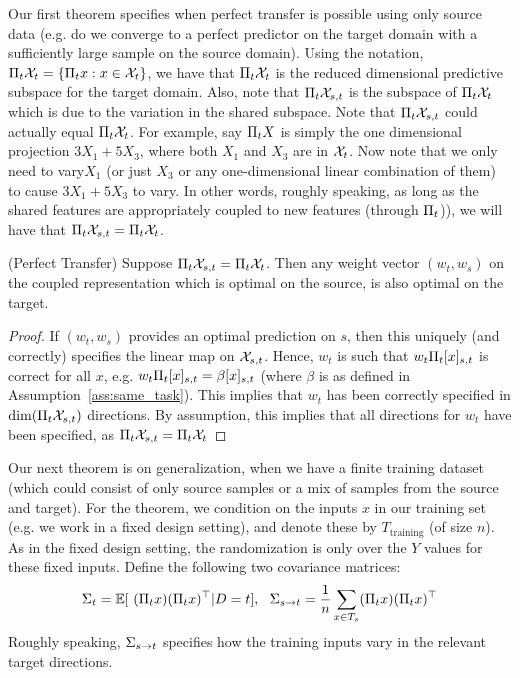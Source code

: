 \iffalse
First
note, that $w_t$ is a weight acting on $\Projt x$, and this projection
couples the features in $\xst$ with $\xtp$ --- so that with a nonzero weight
$w_t$, our predictions could vary with $\xtp$.
\fi

Our first theorem specifies when perfect transfer is possible using
only source data (e.g. do we converge to a perfect predictor on the
target domain with a sufficiently large sample on the source
domain). Using the notation, $\Pi_t \mathcal{X}_t=\{\Pi_t x: x\in\mathcal{X}_t\}$,
we have that $\Pi_t \mathcal{X}_t$ is the reduced
dimensional predictive subspace for the target domain. Also, note that
$\Pi_t \mathcal{X}_{s,t}$ is the subspace of $\Pi_t \mathcal{X}_t$ which is due
to the variation in the shared subspace. Note that $\Pi_t \mathcal{X}_{s,t}$ could
actually equal $\Pi_t \mathcal{X}_t$. For example, say  $\Pi_t X$
is simply the one dimensional projection $3X_1+5X_3$, where both $X_1$ and $X_3$ are in $\mathcal{X}_t$. Now
note that we only need to vary$X_1$ (or just $X_3$ or any
one-dimensional linear combination of them) to cause $3X_1+5X_3$ to
vary. In other words, roughly speaking, as long as the shared features
are appropriately coupled to new features (through $\Pi_t$)), we will have that $\Pi_t
\mathcal{X}_{s,t} = \Pi_t \mathcal{X}_t$.

\begin{theorem}
\label{thm:perfect}
(Perfect Transfer) Suppose $\Pi_t
\mathcal{X}_{s,t} = \Pi_t \mathcal{X}_t$. Then any weight
  vector $(w_t,w_s)$ on the coupled representation which is optimal on
  the source, is also optimal on the target.
\end{theorem}

\begin{proof}
  If $(w_t,w_s)$ provides an optimal prediction on $s$, then this
  uniquely (and correctly) specifies the linear map on
  $\mathcal{X}_{s,t}$. Hence, $w_t$ is such that $w_t \Pi_t {[x]_{s,t}} $ is
  correct for all $x$, e.g. $w_t \Pi_t {[x]_{s,t}} = \beta {[x]_{s,t}}$ (where
  $\beta$ is as defined in Assumption~\ref{ass:same_task}). This
  implies that $w_t$ has been correctly specified in
  $\textrm{dim}(\Pi_t \mathcal{X}_{s,t})$ directions. By assumption, this
  implies that all directions for $w_t$ have been specified, as $\Pi_t \mathcal{X}_{s,t}=\Pi_t \mathcal{X}_t$
\end{proof}

Our next theorem is on generalization, when we have a finite training
dataset (which could consist of only source samples or a mix of
samples from the source and target). For the theorem, we condition on
the inputs $x$ in our training set (e.g. we work in a fixed design
setting), and denote these by $T_{\textrm{training}}$ (of size
$n$). As in the fixed design setting, the randomization is only over
the $Y$ values for these fixed inputs.  Define the following two
covariance matrices:
\[
\Covt = \E[ \ (\Projt x)(\Projt x)^\top |D=t] , \ \ 
\Covstot = \frac{1}{n} \sum_{x\in T_s} (\Projt x)(\Projt x)^\top
\]
Roughly speaking, $\Sigma_{s\rightarrow t}$ specifies how the training inputs vary in 
the relevant target directions.

